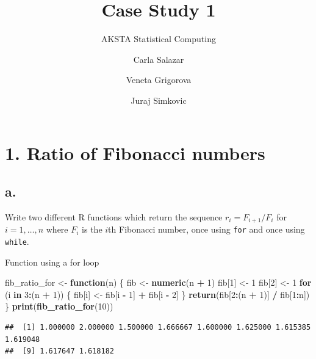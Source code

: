 \documentclass[
]{article}
\title{Case Study 1}
\subtitle{AKSTA Statistical Computing}
\author{Carla Salazar \and Veneta Grigorova \and Juraj Simkovic}
\date{}
\newenvironment{Shaded}{\begin{snugshade}}{\end{snugshade}}
\newcommand{\ControlFlowTok}[1]{\textcolor[rgb]{0.13,0.29,0.53}{\textbf{#1}}}
\newcommand{\DecValTok}[1]{\textcolor[rgb]{0.00,0.00,0.81}{#1}}
\newcommand{\FunctionTok}[1]{\textcolor[rgb]{0.13,0.29,0.53}{\textbf{#1}}}
\newcommand{\NormalTok}[1]{#1}
\newcommand{\OtherTok}[1]{\textcolor[rgb]{0.56,0.35,0.01}{#1}}
\newcommand{\SpecialCharTok}[1]{\textcolor[rgb]{0.81,0.36,0.00}{\textbf{#1}}}
\begin{document}
\maketitle

\section{1. Ratio of Fibonacci
numbers}\label{ratio-of-fibonacci-numbers}

\subsection{a.}\label{a.}

Write two different R functions which return the sequence
\(r_{i}=F_{i+1}/F_i\) for \(i=1,\ldots,n\) where \(F_i\) is the \(i\)th
Fibonacci number, once using \texttt{for} and once using \texttt{while}.

Function using a for loop

\begin{Shaded}
\begin{Highlighting}[]
\NormalTok{fib\_ratio\_for }\OtherTok{\textless{}{-}} \ControlFlowTok{function}\NormalTok{(n) \{}
\NormalTok{  fib }\OtherTok{\textless{}{-}} \FunctionTok{numeric}\NormalTok{(n }\SpecialCharTok{+} \DecValTok{1}\NormalTok{)}
\NormalTok{  fib[}\DecValTok{1}\NormalTok{] }\OtherTok{\textless{}{-}} \DecValTok{1}
\NormalTok{  fib[}\DecValTok{2}\NormalTok{] }\OtherTok{\textless{}{-}} \DecValTok{1}
  \ControlFlowTok{for}\NormalTok{ (i }\ControlFlowTok{in} \DecValTok{3}\SpecialCharTok{:}\NormalTok{(n }\SpecialCharTok{+} \DecValTok{1}\NormalTok{)) \{}
\NormalTok{    fib[i] }\OtherTok{\textless{}{-}}\NormalTok{ fib[i }\SpecialCharTok{{-}} \DecValTok{1}\NormalTok{] }\SpecialCharTok{+}\NormalTok{ fib[i }\SpecialCharTok{{-}} \DecValTok{2}\NormalTok{]}
\NormalTok{  \}}
  \FunctionTok{return}\NormalTok{(fib[}\DecValTok{2}\SpecialCharTok{:}\NormalTok{(n }\SpecialCharTok{+} \DecValTok{1}\NormalTok{)] }\SpecialCharTok{/}\NormalTok{ fib[}\DecValTok{1}\SpecialCharTok{:}\NormalTok{n])}
\NormalTok{\}}
\FunctionTok{print}\NormalTok{(}\FunctionTok{fib\_ratio\_for}\NormalTok{(}\DecValTok{10}\NormalTok{))}
\end{Highlighting}
\end{Shaded}

\begin{verbatim}
##  [1] 1.000000 2.000000 1.500000 1.666667 1.600000 1.625000 1.615385 1.619048
##  [9] 1.617647 1.618182
\end{verbatim}
\end{document}
